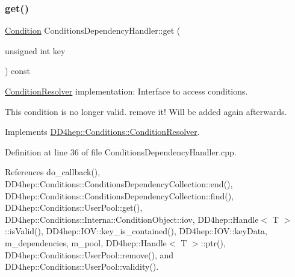 \subsubsection{\texorpdfstring{get()}{get()}\hspace{0.1cm}{\footnotesize\ttfamily [2/2]}}
{\footnotesize\ttfamily \hyperlink{class_d_d4hep_1_1_conditions_1_1_condition}{Condition} Conditions\+Dependency\+Handler\+::get (\begin{DoxyParamCaption}\item[{unsigned int}]{key }\end{DoxyParamCaption}) const\hspace{0.3cm}{\ttfamily [virtual]}}



\hyperlink{class_d_d4hep_1_1_conditions_1_1_condition_resolver}{Condition\+Resolver} implementation\+: Interface to access conditions. 

This condition is no longer valid. remove it! Will be added again afterwards. 

Implements \hyperlink{class_d_d4hep_1_1_conditions_1_1_condition_resolver_ac321d32bbe1d5e777859c2490c68b571}{D\+D4hep\+::\+Conditions\+::\+Condition\+Resolver}.



Definition at line 36 of file Conditions\+Dependency\+Handler.\+cpp.



References do\+\_\+callback(), D\+D4hep\+::\+Conditions\+::\+Conditions\+Dependency\+Collection\+::end(), D\+D4hep\+::\+Conditions\+::\+Conditions\+Dependency\+Collection\+::find(), D\+D4hep\+::\+Conditions\+::\+User\+Pool\+::get(), D\+D4hep\+::\+Conditions\+::\+Interna\+::\+Condition\+Object\+::iov, D\+D4hep\+::\+Handle$<$ T $>$\+::is\+Valid(), D\+D4hep\+::\+I\+O\+V\+::key\+\_\+is\+\_\+contained(), D\+D4hep\+::\+I\+O\+V\+::key\+Data, m\+\_\+dependencies, m\+\_\+pool, D\+D4hep\+::\+Handle$<$ T $>$\+::ptr(), D\+D4hep\+::\+Conditions\+::\+User\+Pool\+::remove(), and D\+D4hep\+::\+Conditions\+::\+User\+Pool\+::validity().

\hypertarget{class_d_d4hep_1_1_conditions_1_1_conditions_dependency_handler_a75cdb86dde27a5fc974275a5eb7bc786}{}\label{class_d_d4hep_1_1_conditions_1_1_conditions_dependency_handler_a75cdb86dde27a5fc974275a5eb7bc786} 
